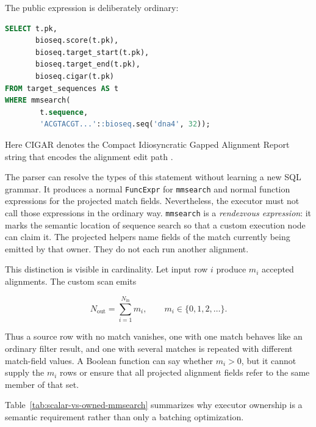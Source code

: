 The public expression is deliberately ordinary:

\begin{lstlisting}[language=SQL]
SELECT t.pk,
       bioseq.score(t.pk),
       bioseq.target_start(t.pk),
       bioseq.target_end(t.pk),
       bioseq.cigar(t.pk)
FROM target_sequences AS t
WHERE mmsearch(
        t.sequence,
        'ACGTACGT...'::bioseq.seq('dna4', 32));
\end{lstlisting}

Here CIGAR denotes the Compact Idiosyncratic Gapped Alignment Report string
that encodes the alignment edit path \cite{sam_format_specification}.

The parser can resolve the types of this statement without learning a new SQL
grammar.  It produces a normal \texttt{FuncExpr} for \texttt{mmsearch} and
normal function expressions for the projected match fields.  Nevertheless,
the executor must not call those expressions in the ordinary way.
\texttt{mmsearch} is a \emph{rendezvous expression}: it marks the semantic
location of sequence search so that a custom execution node can claim it.
The projected helpers name fields of the match currently being emitted by
that owner.  They do not each run another alignment.

This distinction is visible in cardinality.  Let input row \(i\) produce
\(m_i\) accepted alignments.  The custom scan emits

\[
    N_{\mathrm{out}} = \sum_{i=1}^{N_{\mathrm{in}}} m_i ,
    \qquad m_i \in \{0,1,2,\ldots\}.
\]

Thus a source row with no match vanishes, one with one match behaves like an
ordinary filter result, and one with several matches is repeated with
different match-field values.  A Boolean function can say whether
\(m_i>0\), but it cannot supply the \(m_i\) rows or ensure that all projected
alignment fields refer to the same member of that set.

Table~\ref{tab:scalar-vs-owned-mmsearch} summarizes why executor ownership is a
semantic requirement rather than only a batching optimization.

